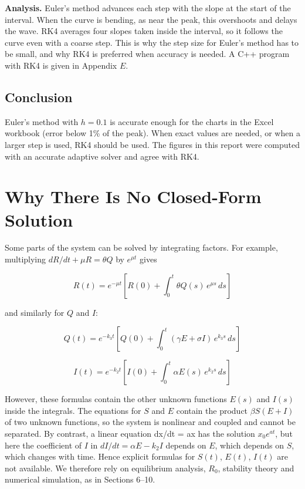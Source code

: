 \documentclass[12pt,a4paper]{article}
\theoremstyle{definition}
\begin{document}
\textbf{Analysis. }Euler's method advances each step with the slope at the start of the interval. When the curve is bending, as near the peak, this overshoots and delays the wave. RK4 averages four slopes taken inside the interval, so it follows the curve even with a coarse step. This is why the step size for Euler's method has to be small, and why RK4 is preferred when accuracy is needed. A C++ program with RK4 is given in Appendix $E$.


\subsection{Conclusion}

Euler's method with $h = 0.1$ is accurate enough for the charts in the Excel workbook (error below 1\% of the peak). When exact values are needed, or when a larger step is used, RK4 should be used. The figures in this report were computed with an accurate adaptive solver and agree with RK4.


\section{Why There Is No Closed-Form Solution}

Some parts of the system can be solved by integrating factors. For example, multiplying $dR/dt + \mu R = \theta Q$ by $e^{\mu t}$ gives


\begin{equation}
R(t) = e^{-\mu t}\left[R(0)+\int_0^t \theta Q(s)\,e^{\mu s}\,ds\right]
\end{equation}

and similarly for $Q$ and $I$:


\begin{equation}
Q(t) = e^{-k_3 t}\left[Q(0)+\int_0^t (\gamma E+\sigma I)\,e^{k_3 s}\,ds\right]
\end{equation}

\begin{equation}
I(t) = e^{-k_2 t}\left[I(0)+\int_0^t \alpha E(s)\,e^{k_2 s}\,ds\right]
\end{equation}

However, these formulas contain the other unknown functions $E(s)$ and $I(s)$ inside the integrals. The equations for $S$ and $E$ contain the product $\beta S(E + I)$ of two unknown functions, so the system is nonlinear and coupled and cannot be separated. By contrast, a linear equation dx/dt = ax has the solution $x_{0}e^{at}$, but here the coefficient of $I$ in $dI/dt = \alpha E - k_{2}I$ depends on $E$, which depends on $S$, which changes with time. Hence explicit formulas for $S(t)$, $E(t)$, $I(t)$ are not available. We therefore rely on equilibrium analysis, $R_{0}$, stability theory and numerical simulation, as in Sections 6–10.
\end{document}
